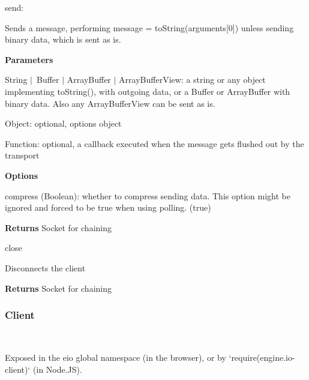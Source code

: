 \begin{DoxyItemize}
\item {\ttfamily send}\+:
\begin{DoxyItemize}
\item Sends a message, performing {\ttfamily message = to\+String(arguments\mbox{[}0\mbox{]})} unless sending binary data, which is sent as is.
\item {\bfseries Parameters}
\begin{DoxyItemize}
\item {\ttfamily String} $\vert$ {\ttfamily Buffer} $\vert$ {\ttfamily Array\+Buffer} $\vert$ {\ttfamily Array\+Buffer\+View}\+: a string or any object implementing {\ttfamily to\+String()}, with outgoing data, or a Buffer or Array\+Buffer with binary data. Also any Array\+Buffer\+View can be sent as is.
\item {\ttfamily Object}\+: optional, options object
\item {\ttfamily Function}\+: optional, a callback executed when the message gets flushed out by the transport
\end{DoxyItemize}
\item {\bfseries Options}
\begin{DoxyItemize}
\item {\ttfamily compress} ({\ttfamily Boolean})\+: whether to compress sending data. This option might be ignored and forced to be {\ttfamily true} when using polling. ({\ttfamily true})
\end{DoxyItemize}
\item {\bfseries Returns} {\ttfamily Socket} for chaining
\end{DoxyItemize}
\item {\ttfamily close}
\begin{DoxyItemize}
\item Disconnects the client
\item {\bfseries Returns} {\ttfamily Socket} for chaining
\end{DoxyItemize}
\end{DoxyItemize}

\subsubsection*{Client}



~\newline


Exposed in the {\ttfamily eio} global namespace (in the browser), or by `require(\textquotesingle{}engine.\+io-\/client\textquotesingle{})` (in Node.\+JS).

